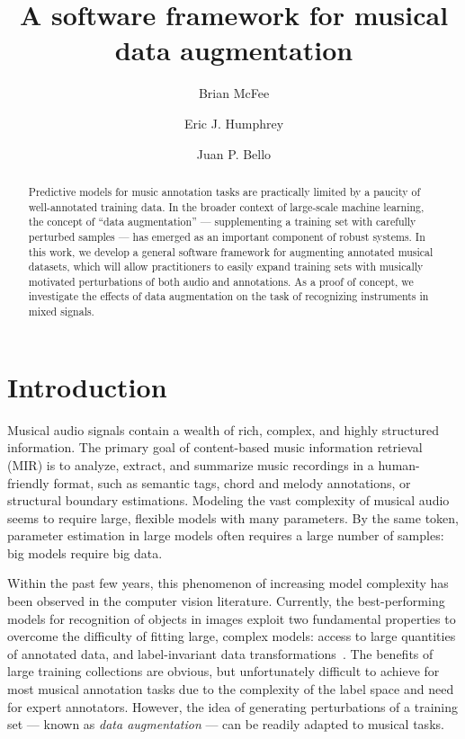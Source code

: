 \documentclass{article}
\title{A software framework for musical data augmentation}
\author[1,2,*]{Brian McFee}
\author[2,3]{Eric J. Humphrey}
\author[2]{Juan P. Bello}
\affil[1]{Center for Data Science, New York University}
\affil[2]{Music and Audio Research Laboratory, New York University}
\affil[3]{MuseAmi, Inc.}
\begin{document}
%
\maketitle
%
\let\oldthefootnote\thefootnote%
\renewcommand{\thefootnote}{\fnsymbol{footnote}}
\let\thefootnote\oldthefootnote%
%
\begin{abstract}
Predictive models for music annotation tasks are practically limited by a paucity of
well-annotated training data.
In the broader context of large-scale machine learning, the concept of ``data
augmentation'' --- supplementing a training set with carefully perturbed samples ---
has emerged as an important component of robust systems.
In this work, we develop a general software framework for augmenting annotated
musical datasets, which will allow practitioners to easily expand training sets
with musically motivated perturbations of both audio and annotations.
As a proof of concept, we investigate the effects of data augmentation on
the task of recognizing instruments in mixed signals.
\end{abstract}
%
\section{Introduction}
\label{sec:introduction}


Musical audio signals contain a wealth of rich, complex, and highly structured
information.  The primary goal of content-based music information retrieval (MIR) is to
analyze, extract, and summarize music recordings in a human-friendly
format, such as semantic tags, chord and melody annotations, or structural boundary
estimations.  Modeling the vast complexity of musical audio seems to require large, 
flexible models with many parameters.
By the same token, parameter estimation in large models often requires
a large number of samples: big models require big data.

Within the past few years, this phenomenon of increasing model complexity has been 
observed in the computer vision literature.  Currently, the best-performing models for 
recognition of objects in images exploit two fundamental properties to overcome the 
difficulty of fitting large, complex models: access to large quantities of annotated data, 
and label-invariant data transformations~\cite{krizhevsky2012imagenet}.
The benefits of large training collections are obvious, but unfortunately difficult to
achieve for most musical annotation tasks due to the complexity of the label space and
need for expert annotators.  However, the idea of generating perturbations of a training
set --- known as \emph{data augmentation} --- can be readily adapted to musical tasks.
\end{document}
